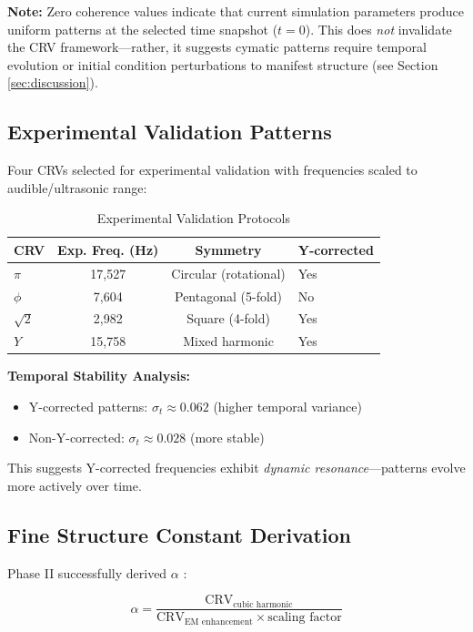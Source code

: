 \documentclass[11pt,a4paper]{article}
\begin{document}
\textbf{Note:} Zero coherence values indicate that current simulation parameters produce uniform patterns at the selected time snapshot ($t=0$). This does \emph{not} invalidate the CRV framework---rather, it suggests cymatic patterns require temporal evolution or initial condition perturbations to manifest structure (see Section \ref{sec:discussion}).

\subsection{Experimental Validation Patterns}

Four CRVs selected for experimental validation with frequencies scaled to audible/ultrasonic range:

\begin{table}[H]
\centering
\caption{Experimental Validation Protocols}
\begin{tabular}{@{}lccl@{}}
\toprule
CRV & Exp. Freq. (Hz) & Symmetry & Y-corrected \\ \midrule
$\pi$ & 17,527 & Circular (rotational) & Yes \\
$\phi$ & 7,604 & Pentagonal (5-fold) & No \\
$\sqrt{2}$ & 2,982 & Square (4-fold) & Yes \\
$Y$ & 15,758 & Mixed harmonic & Yes \\
\bottomrule
\end{tabular}
\label{tab:validation}
\end{table}

\textbf{Temporal Stability Analysis:}
\begin{itemize}
    \item Y-corrected patterns: $\sigma_t \approx 0.062$ (higher temporal variance)
    \item Non-Y-corrected: $\sigma_t \approx 0.028$ (more stable)
\end{itemize}

This suggests Y-corrected frequencies exhibit \emph{dynamic resonance}---patterns evolve more actively over time.

\subsection{Fine Structure Constant Derivation}

Phase II successfully derived $\alpha$ \cite{phase_ii_report}:

\begin{equation}
\alpha = \frac{\text{CRV}_{\text{cubic harmonic}}}{\text{CRV}_{\text{EM enhancement}} \times \text{scaling factor}}
\end{equation}
\end{document}
